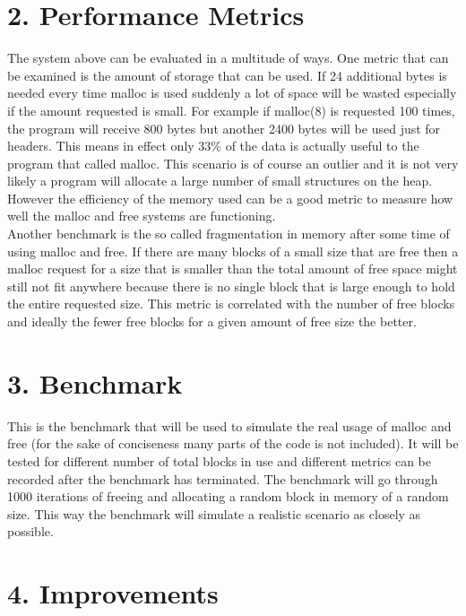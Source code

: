 \documentclass[a4paper,11pt]{scrartcl}
\begin{document}
{\section*{2. Performance Metrics}
The system above can be evaluated in a multitude of ways. One metric that can be examined is the amount of storage that can be used. If 24 additional bytes is needed every time malloc is used suddenly a lot of space will be wasted especially if the amount requested is small. For example if malloc(8) is requested 100 times, the program will receive 800 bytes but another 2400 bytes will be used just for headers. This means in effect only 33\% of the data is actually useful to the program that called malloc. This scenario is of course an outlier and it is not very likely a program will allocate a large number of small structures on the heap. However the efficiency of the memory used can be a good metric to measure how well the malloc and free systems are functioning.\\
Another benchmark is the so called fragmentation in memory after some time of using malloc and free. If there are many blocks of a small size that are free then a malloc request for a size that is smaller than the total amount of free space might still not fit anywhere because there is no single block that is large enough to hold the entire requested size. This metric is correlated with the number of free blocks and ideally the fewer free blocks for a given amount of free size the better.
\section*{3. Benchmark}

This is the benchmark that will be used to simulate the real usage of malloc and free (for the sake of conciseness many parts of the code is not included). It will be tested for different number of total blocks in use and different metrics can be recorded after the benchmark has terminated. The benchmark will go through 1000 iterations of freeing and allocating a random block in memory of a random size. This way the benchmark will simulate a realistic scenario as closely as possible.
\section*{4. Improvements}
}
\end{document}
